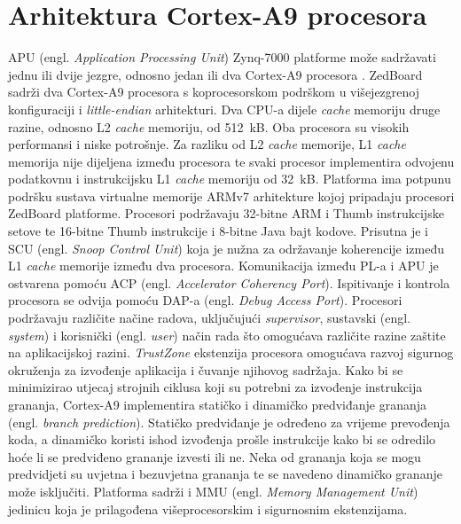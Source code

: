 \documentclass[times, utf8, diplomski, numeric]{fer}
\begin{document}
\chapter{Arhitektura Cortex-A9 procesora}
APU (engl. \textit{Application Processing Unit}) Zynq-7000 platforme može sadržavati jednu ili dvije jezgre, odnosno jedan
ili dva Cortex-A9 procesora \cite{zynq_trm}. ZedBoard sadrži dva Cortex-A9 procesora s koprocesorskom podrškom u višejezgrenoj
konfiguraciji i \textit{little-endian} arhitekturi. Dva CPU-a dijele \textit{cache} memoriju druge razine,
odnosno L2 \textit{cache} memoriju, od 512~kB.
Oba procesora su visokih performansi i niske potrošnje. Za razliku od L2 \textit{cache} memorije, L1 \textit{cache}
memorija nije dijeljena između procesora te svaki procesor implementira odvojenu podatkovnu i instrukcijsku
L1 \textit{cache} memoriju od 32~kB. Platforma ima potpunu podršku sustava virtualne memorije ARMv7 arhitekture kojoj
pripadaju procesori ZedBoard platforme. Procesori podržavaju 32-bitne ARM i Thumb instrukcijske setove te 16-bitne
Thumb instrukcije i 8-bitne Java bajt kodove. Prisutna je i SCU (engl. \textit{Snoop Control Unit}) koja je nužna za održavanje
koherencije između L1 \textit{cache} memorije između dva procesora. Komunikacija između PL-a i APU je ostvarena
pomoću ACP (engl. \textit{Accelerator Coherency Port}). Ispitivanje i kontrola procesora se odvija pomoću DAP-a
(engl. \textit{Debug Access Port}). Procesori podržavaju različite načine radova, uključujući \textit{supervisor},
sustavski (engl. \textit{system}) i korisnički (engl. \textit{user}) način rada što omogućava različite razine
zaštite na aplikacijskoj razini. \textit{TrustZone} ekstenzija procesora omogućava razvoj sigurnog okruženja za
izvođenje aplikacija i čuvanje njihovog sadržaja. Kako bi se minimizirao utjecaj strojnih ciklusa koji su potrebni
za izvođenje instrukcija grananja, Cortex-A9 implementira statičko i dinamičko predviđanje grananja (engl.
\textit{branch prediction}). Statičko predviđanje je određeno za vrijeme prevođenja koda, a dinamičko koristi
ishod izvođenja prošle instrukcije kako bi se odredilo hoće li se predviđeno grananje izvesti ili ne. Neka od
grananja koja se mogu predvidjeti su uvjetna i bezuvjetna grananja te se navedeno dinamičko grananje može isključiti.
Platforma sadrži i MMU (engl. \textit{Memory Management Unit}) jedinicu koja je prilagođena višeprocesorskim i sigurnosnim
ekstenzijama.
\end{document}
